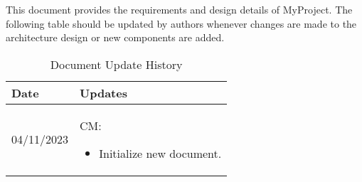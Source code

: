 This document provides the requirements and design details of MyProject.
The following table should be
updated by authors whenever changes are made to the architecture
design or new components are added.

\begin{longtable}{|l||p{13.5cm}|}
	\caption{Document Update History \label{Table::UpdateHistory}} \\
	\hline
	\textbf{Date} & \textbf{Updates}                               \\
	\hline
	\endhead

	04/11/2023    & CM:
	\begin{itemize}[topsep=0pt,itemsep=0pt,parsep=0pt,partopsep=0pt,leftmargin=12pt]
		\item Initialize new document.
	\end{itemize}
	\\ \hline
\end{longtable}